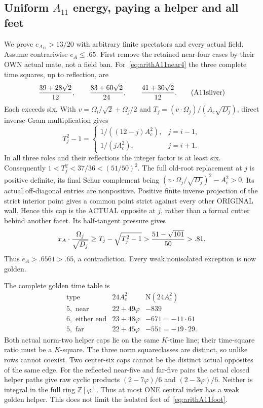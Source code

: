 \subsection{Uniform \(A_{11}\) energy, paying a helper and all feet}
\label{app:arithA11uniform}

We prove \(e_{A_{11}}>13/20\) with arbitrary
finite spectators and every actual field.
Assume contrariwise \(e_A\le.65\).
First remove the retained near-four cases
by their OWN actual mate, not a field ban.
For~\eqref{eq:arithA11near4} the three complete
time squares, up to reflection, are
\[
 {39+28\sqrt2\over12},\qquad
 {83+60\sqrt2\over24},\qquad
 {41+30\sqrt2\over12}.
\tag{A11silver}\label{eq:arithA11silvertimes}
\]
Each exceeds six.
With \(v=\Omega_i/\sqrt2+\Omega_j/2\) and
\(T_j=(v\cdot\Omega_j)/(A_c\sqrt{D_j})\),
direct inverse-Gram multiplication gives
\[
 T_j^2-1=
 \begin{cases}
  1/((12-j)A_c^2),&j=i-1,\\
  1/(jA_c^2),&j=i+1 .
 \end{cases}
\]
In all three roles and their reflections the
integer factor is at least six.
Consequently \(1<T_j^2<37/36<(51/50)^2\).
The full old-root replacement at \(j\) is
positive definite, its final Schur complement
being \((v\cdot\Omega_j/\sqrt{D_j})^2-A_c^2>0\).
Its actual off-diagonal entries are nonpositive.
Positive finite inverse projection of the
strict interior point gives a common point
strict against every other ORIGINAL wall.
Hence this cap is the ACTUAL opposite at
\(j\), rather than a formal cutter behind
another facet.
Its half-tangent pressure gives
\[
 x_A\cdot{\Omega_j\over\sqrt{D_j}}
 \ge T_j-\sqrt{T_j^2-1}
 >{51-\sqrt{101}\over50}>.81 .
\]
Thus \(e_A>.6561>.65\), a contradiction.
Every weak nonisolated exception is now golden.

The complete golden time table is
\[
 \begin{array}{c|c|r}
 \text{type}&24A_c^2&\mathrm N(24A_c^2)\\ \hline
 5,\text{ near}&22+49\varphi&-839\\
 6,\text{ either end}&23+48\varphi&-671=-11\cdot61\\
 5,\text{ far}&22+45\varphi&-551=-19\cdot29 .
 \end{array}
\tag{A11gold}\label{eq:arithA11goldtimes}
\]
Both actual norm-two helper caps lie on the
same \(K\)-time line; their time-square ratio
must be a \(K\)-square.
The three norm squareclasses are distinct,
so unlike rows cannot coexist.
Two center-six caps cannot be the distinct
actual opposites of the same edge.
For the reflected near-five and far-five
pairs the actual closed helper paths give
raw cyclic products
\((2-7\varphi)/6\) and \((2-3\varphi)/6\).
Neither is integral in the full ring
\(\mathbb Z[\varphi]\).
Thus at most ONE central index has a weak
golden helper.  This does not limit the
isolated feet of~\eqref{eq:arithA11foot}.

